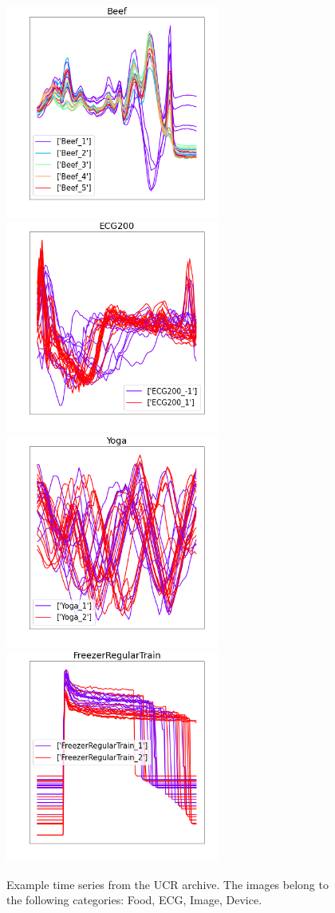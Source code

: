 \documentclass[a4paper,11pt,twoside]{report}
\theoremstyle{definition}
\begin{document}
 \FloatBarrier
\begin{figure}[h!]
\centering
\includegraphics[height=7cm]{imgs/UCR_Beef.png}
\includegraphics[height=7cm]{imgs/UCR_ECG200.png}
\includegraphics[height=7cm]{imgs/UCR_Yoga.png}
\includegraphics[height=7cm]{imgs/UCR_FreezerRegularTrain.png}
\caption{Example time series from the UCR archive. The images belong to the following categories: Food, ECG, Image, Device.}
\label{fig:UCR_samples}
\end{figure}
\end{document}
